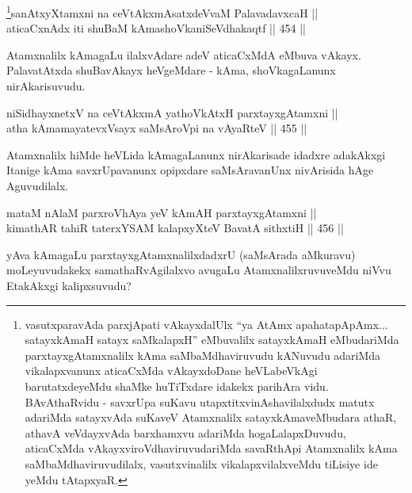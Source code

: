 \begin{shl}
\footnote{vasutxparavAda parxjApati vAkayxdalUlx ``ya AtAmx apahatapApAmx... satayxkAmaH satayx saMkalapxH'' eMbuvalilx satayxkAmaH eMbudariMda parxtayxgAtamxnalilx kAma saMbaMdhaviruvudu kANuvudu adariMda vikalapxvanunx aticaCxMda vAkayxdoDane heVLabeVkAgi barutatxdeyeMdu shaMke huTiTxdare idakekx parihAra vidu. BAvAthaRvidu - savxrUpa suKavu utapxtitxvinAshavilalxdudx matutx adariMda satayxvAda suKaveV Atamxnalilx satayxkAmaveMbudara athaR, athavA veVdayxvAda barxhamxvu adariMda hogaLalapxDuvudu, aticaCxMda vAkayxviroVdhaviruvudariMda savaRthApi Atamxnalilx kAma saMbaMdhaviruvudilalx, vasutxvinalilx vikalapxvilalxveMdu tiLisiye ide yeMdu tAtapxyaR.}sanAtxyXtamxni na ceVtAkxmAsatxdeVvaM PalavadavxcaH || \\
aticaCxnAdx iti shuBaM kAmashoVkaniSeVdhakaqtf \hfill || 454 ||  
\end{shl}

\begin{artha}
Atamxnalilx kAmagaLu ilalxvAdare adeV aticaCxMdA eMbuva
vAkayx. PalavatAtxda shuBavAkayx heVgeMdare - kAma, shoVkagaLanunx
nirAkarisuvudu.
\end{artha}


\begin{shl}
niSidhayxnetxV na ceVtAkxmA yathoVkAtxH parxtayxgAtamxni || \\
atha kAmamayatevxV\s sayx saMsAroV\s pi na vAyaRteV \hfill || 455 ||  
\end{shl}

\begin{artha}
Atamxnalilx hiMde heVLida kAmagaLanunx nirAkarisade idadxre
adakAkxgi Itanige kAma savxrUpavanunx opipxdare saMsAravanUnx
nivArisida hAge Aguvudilalx.
\end{artha}


\begin{shl}
mataM nAlaM parxroVhAya yeV kAmAH parxtayxgAtamxni || \\
kimathAR tahiR taterxYSAM kalapxyXteV BavatA sithxtiH \hfill || 456 ||  
\end{shl}

\begin{artha}
yAva kAmagaLu parxtayxgAtamxnalilxdadxrU (saMsArada aMkuravu)
moLeyuvudakekx samathaRvAgilalxvo avugaLu AtamxnalilxruvuveMdu niVvu
EtakAkxgi kalipxsuvudu?
\end{artha}

